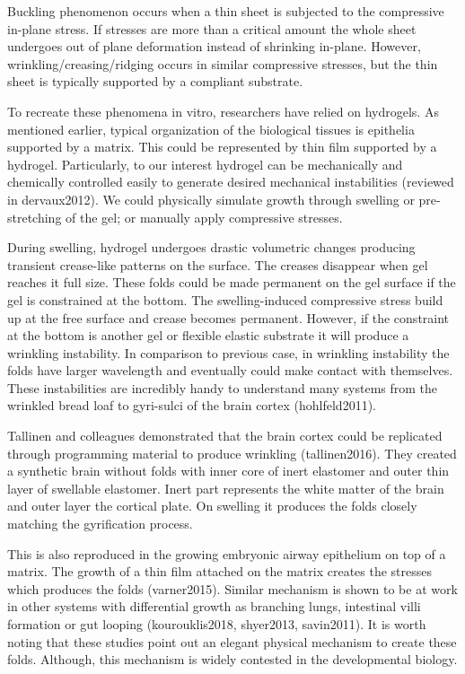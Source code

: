 \documentclass[
]{article}
\begin{document}
Buckling phenomenon occurs when a thin sheet is subjected to the
compressive in-plane stress. If stresses are more than a critical amount
the whole sheet undergoes out of plane deformation instead of shrinking
in-plane. However, wrinkling/creasing/ridging occurs in similar
compressive stresses, but the thin sheet is typically supported by a
compliant substrate.

To recreate these phenomena in vitro, researchers have relied on
hydrogels. As mentioned earlier, typical organization of the biological
tissues is epithelia supported by a matrix. This could be represented by
thin film supported by a hydrogel. Particularly, to our interest
hydrogel can be mechanically and chemically controlled easily to
generate desired mechanical instabilities (reviewed in dervaux2012). We
could physically simulate growth through swelling or pre-stretching of
the gel; or manually apply compressive stresses.

During swelling, hydrogel undergoes drastic volumetric changes producing
transient crease-like patterns on the surface. The creases disappear
when gel reaches it full size. These folds could be made permanent on
the gel surface if the gel is constrained at the bottom. The
swelling-induced compressive stress build up at the free surface and
crease becomes permanent. However, if the constraint at the bottom is
another gel or flexible elastic substrate it will produce a wrinkling
instability. In comparison to previous case, in wrinkling instability
the folds have larger wavelength and eventually could make contact with
themselves. These instabilities are incredibly handy to understand many
systems from the wrinkled bread loaf to gyri-sulci of the brain cortex
(hohlfeld2011).

Tallinen and colleagues demonstrated that the brain cortex could be
replicated through programming material to produce wrinkling
(tallinen2016). They created a synthetic brain without folds with inner
core of inert elastomer and outer thin layer of swellable elastomer.
Inert part represents the white matter of the brain and outer layer the
cortical plate. On swelling it produces the folds closely matching the
gyrification process.

This is also reproduced in the growing embryonic airway epithelium on
top of a matrix. The growth of a thin film attached on the matrix
creates the stresses which produces the folds (varner2015). Similar
mechanism is shown to be at work in other systems with differential
growth as branching lungs, intestinal villi formation or gut looping
(kourouklis2018, shyer2013, savin2011). It is worth noting that these
studies point out an elegant physical mechanism to create these folds.
Although, this mechanism is widely contested in the developmental
biology.
\end{document}
